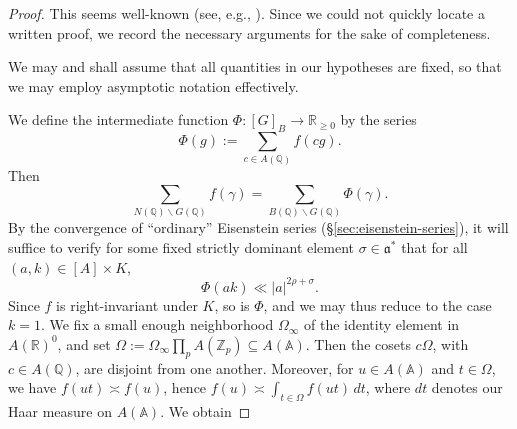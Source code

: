 \documentclass[reqno]{amsart}
\theoremstyle{plain} \newtheorem{theorem} {Theorem}
\theoremstyle{definition} \newtheorem{definition} [theorem] {Definition}
\theoremstyle{itplain} %
\numberwithin{equation}{section}
\numberwithin{theorem}{section}
\renewcommand{\geq}{\geqslant}
\begin{document}
\begin{proof}
  This seems well-known (see, e.g., \cite[\S7.6]{MR1694894}).  Since we could not quickly locate a written proof, we record the necessary arguments for the sake of completeness.


  We may and shall assume that all quantities in our hypotheses are fixed, so that we may employ asymptotic notation effectively.

  We define the intermediate function $\Phi : [G]_B \rightarrow \mathbb{R}_{\geq 0}$ by the series
  \begin{equation*}
    \Phi(g) := \sum _{c \in A(\mathbb{Q})} f(c g).
  \end{equation*}
  Then
  \begin{equation*}
    \sum_{N(\mathbb{Q}) \backslash G(\mathbb{Q})} f(\gamma) = \sum _{B(\mathbb{Q}) \backslash G(\mathbb{Q})} \Phi(\gamma).
  \end{equation*}
  By the convergence of ``ordinary'' Eisenstein series (\S\ref{sec:eisenstein-series}), it will suffice to verify for some fixed strictly dominant element $\sigma \in \mathfrak{a}^*$ that for all $(a,k) \in [A] \times K$,
  \begin{equation}\label{eq:phia-k-ll}
    \Phi(a k) \ll |a|^{2 \rho + \sigma}.
  \end{equation}
  Since $f$ is right-invariant under $K$, so is $\Phi$, and we may thus reduce to the case $k = 1$.  We fix a small enough neighborhood $\Omega_\infty$ of the identity element in $A(\mathbb{R})^0$, and set $\Omega := \Omega_\infty \prod_p A(\mathbb{Z}_p) \subseteq A(\mathbb{A})$.  Then the cosets $c \Omega$, with $c \in A(\mathbb{Q})$, are disjoint from one another.  Moreover, for $u \in A(\mathbb{A})$ and $t \in \Omega$, we have $f(u t) \asymp f(u)$, hence $f(u) \asymp \int _{t \in \Omega } f(u t) \, d t$, where $d t$ denotes our Haar measure on $A(\mathbb{A})$.  We obtain


\end{proof}
\end{document}
